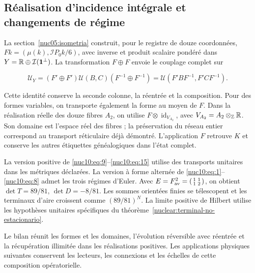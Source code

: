 \subsection{Réalisation d’incidence intégrale et changements de régime}

La section~\ref{nuc05:isometria} construit, pour le registre de douze
coordonnées, \(Fk=(\mu(k),\mathcal IP_0k/6)\), avec inverse et
produit scalaire pondéré dans \(Y=\mathbb R\oplus\mathcal I(\mathbf1^\perp)\).
La transformation \(F\oplus F\) envoie le couplage complet sur



\begin{equation}
\mathcal U_Y=(F'\oplus F')\mathcal U(B,C)(F^{-1}\oplus F^{-1})
=\mathcal U(F'BF^{-1},F'CF^{-1}).
\label{nuc10:eq:16}
\end{equation}



Cette identité conserve la seconde colonne, la réentrée et la composition.
Pour des formes variables, on transporte également la forme au moyen de \(F\).
Dans la réalisation réelle des douze fibres \(A_2\), on utilise
\(F\otimes\operatorname{id}_{V_{A_2}}\), avec
\(V_{A_2}=A_2\otimes_{\mathbb Z}\mathbb R\). Son domaine est l’espace réel des
fibres ; la préservation du réseau entier correspond au transport
réticulaire déjà démontré. L’application \(F\) retrouve \(K\) et
conserve les autres étiquettes généalogiques dans l’état complet.

La version positive de \eqref{nuc10:eq:9}–\eqref{nuc10:eq:15} utilise des transports unitaires dans les
métriques déclarées. La version à forme alternée de \eqref{nuc10:eq:1}–\eqref{nuc10:eq:8} admet
les trois régimes d’Euler. Avec
\(E=F_{\rm av}^2=\left(
\begin{smallmatrix}1&1\\1&2\end{smallmatrix}\right)\),
on obtient \(\det T=89/81\), \(\det D=-8/81\). Les sommes
orientées finies se télescopent et les terminaux d’aire croissent comme
\((89/81)^N\). La limite positive de Hilbert utilise les hypothèses
unitaires spécifiques du théorème~\ref{nuclear:terminal-no-estacionario}.


Le bilan réunit les formes et les domaines, l’évolution réversible avec réentrée
et la récupération illimitée dans les réalisations positives. Les
applications physiques suivantes conservent les lecteurs, les connexions et les
échelles de cette composition opératorielle.
